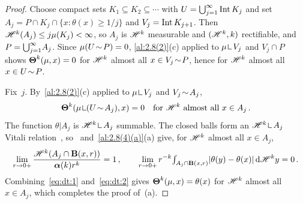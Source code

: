 \begin{proof}
    Choose compact sets $K_1 \subseteq K_2 \subseteq \cdots$ with $U = {{\textstyle \bigcup}}_{j=1}^\infty \operatorname{Int}
    K_j$ and set $A_j = P \cap K_j \cap \{ x : \theta(x) \ge 1/j \}$ and $V_j = \operatorname{Int} K_{j+1}$.
    Then $\mathscr{H}^{k}(A_j) \le j \mu(K_j) < \infty$, so $A_j$ is $\mathscr{H}^{k}$ measurable and
    $(\mathscr{H}^{k},k)$ rectifiable, and $P = {{\textstyle \bigcup}}_{j=1}^\infty A_j$. Since $\mu(U \!\sim\! P)
    = 0$, \ref{al:2.8(2)}(c) applied to $\mu \restrict V_j$ and $V_j \cap P$ shows
    $\boldsymbol{\Theta}^{k}(\mu,x) = 0$ for $\mathscr{H}^{k}$ almost all $x \in V_j \!\sim\! P$, hence for
    $\mathscr{H}^{k}$ almost all $x \in U \!\sim\! P$.

    Fix~$j$. By~\ref{al:2.8(2)}(c) applied to $\mu \restrict V_j$ and $V_j \!\sim\! A_j$,
    \begin{equation}
        \label{eq:dt:1}
        \density^{\vdim}(\mu \restrict (U \without A_j), x) = 0 \quad \text{for $\HM^{\vdim}$ almost
        all $x \in A_j$} \,.
    \end{equation}
    The function $\theta | A_j$ is $\HM^{\vdim} \restrict A_j$ summable. The closed balls form an
    $\HM^{\vdim} \restrict A_j$ Vitali relation~\cite[2.8.18]{Federer1969}, so~\cite[2.9.9]{Federer1969}
    and~\ref{al:2.8(4)(a)}(a) give, for $\mathscr{H}^{k}$ almost all $x \in A_j$,
    \begin{equation}
        \label{eq:dt:2}
        \lim_{r \to 0+} \frac{\mathscr{H}^{k}(A_j \cap \mathbf{B}(x,r))}{\boldsymbol{\alpha}(k) r^{k}} =
        1 \,, \qquad \lim_{r \to 0+} r^{-k} {\textstyle\int_{A_j \cap \mathbf{B}(x,r)}^{}} |\theta(y) -
        \theta(x)| \,\mathrm{d} \mathscr{H}^{k} y = 0 \,.
    \end{equation}
    Combining~\eqref{eq:dt:1} and~\eqref{eq:dt:2} gives $\boldsymbol{\Theta}^{k}(\mu,x) = \theta(x)$ for
    $\mathscr{H}^{k}$ almost all $x \in A_j$, which completes the proof of~(a).


\end{proof}
